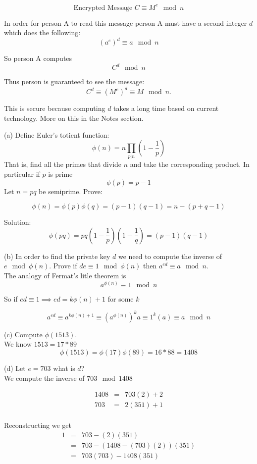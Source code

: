 \documentclass[16 pt]{amsart}
\theoremstyle{definition}
\theoremstyle{remark}
\numberwithin{equation}{subsection}
\begin{document}
\[
\text{Encrypted Message } C \equiv M^e \mod{n}
\]

In order for person A to read this message person A must have a second integer $d$ which does the following:
\[
(a^e)^d \equiv a \mod{n}
\]

So person A computes
\[
C^d \mod{n}
\]

Thus person is guaranteed to see the message:
\[
C^d \equiv (M^e)^d \equiv M \mod{n}.
\]

This is secure because computing $d$ takes a long time based on current technology.  More on this in the Notes section.

(a) Define Euler's totient function:
\[
\phi(n) = n\prod_{p|n}\left(1 - \frac{1}{p}\right)
\]
That is, find all the primes that divide $n$ and take the corresponding product. In particular if $p$ is prime
\[
\phi(p)= p-1
\]
Let $n=pq$ be semiprime.  Prove:

\[
\phi(n)=\phi(p)\phi(q) = (p-1)(q-1) = n - (p+q-1)
\]



Solution: 
\[
\phi(pq) = pq \left(1 - \frac{1}{p}\right)\left(1 - \frac{1}{q}\right) = (p-1)(q-1)
\]


(b) In order to find the private key $d$ we need to compute the inverse of $e \mod{\phi(n)}$.
Prove if $de\equiv 1 \mod{\phi(n)}$ then $a^{ed} \equiv a \mod{n}$.\\

The analogy of Fermat's litle theorem is
\[
a^{\phi(n)} \equiv 1 \mod n
\]

So if $ed \equiv 1 \implies ed = k\phi(n) +1$ for some $k$

\[
a^{ed} \equiv a^{k\phi(n)+1} \equiv (a^{\phi(n)})^k a \equiv 1^k(a) \equiv a \mod n
\]



(c) Compute $\phi(1513)$.\\

We know $1513 = 17*89$
\[
\phi(1513) = \phi(17)\phi(89) = 16*88 = 1408
\]


(d) Let $e = 703$ what is $d$?\\

We compute the inverse of $703 \mod 1408$

\begin{eqnarray}
1408 & = & 703(2) + 2 \nonumber \\
703 & = & 2(351) + 1 \nonumber \\
\end{eqnarray}

Reconstructing we get
\begin{eqnarray}
1 & = & 703 - (2)(351) \nonumber \\
& = & 703 - (1408 - (703)(2))(351)\nonumber \\
& = & 703(703) - 1408(351) \nonumber 
\end{eqnarray}
\end{document}
